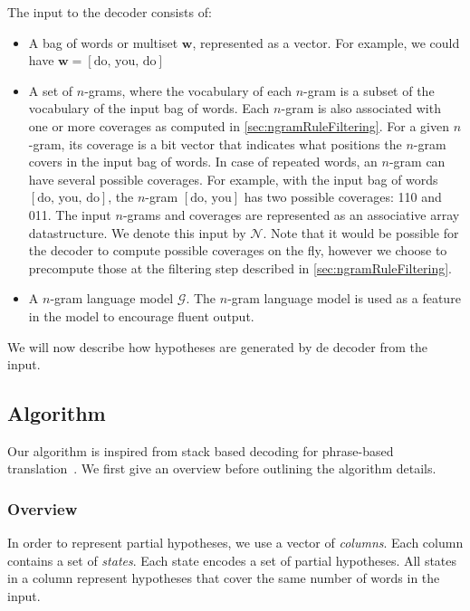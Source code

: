 The input to the decoder consists of:
%
\begin{itemize}
  \item A bag of words or multiset $\bm{w}$, represented as a vector.
    For example, we could have $\bm{w} = [\text{do, you, do}]$
  \item A set of $n$-grams, where the
    vocabulary of each $n$-gram is a subset of the vocabulary of the
    input bag of words. Each $n$-gram is also associated with
    one or more coverages as computed in \autoref{sec:ngramRuleFiltering}.
    For a given $n$-gram, its coverage is a bit vector
    that indicates what positions the $n$-gram covers in the input bag of words.
    In case of repeated words, an $n$-gram can have several possible
    coverages. For example, with the input bag of words
    $[\text{do, you, do}]$, the $n$-gram $[\text{do, you}]$ has
    two possible coverages: 110 and 011.
    The input $n$-grams and coverages are represented as
    an associative array datastructure. We denote this
    input by $\mathcal{N}$. Note that it would be possible for the decoder
    to compute possible coverages on the fly, however we choose to precompute those
    at the filtering step described in \autoref{sec:ngramRuleFiltering}.
  \item A $n$-gram language model $\mathcal{G}$. The $n$-gram
    language model is used as a feature in the model to
    encourage fluent output.
\end{itemize}
%
We will now describe how hypotheses are generated by de decoder
from the input.

\subsection{Algorithm}

Our algorithm is inspired from stack based decoding for phrase-based
translation~\citep{koehn:2010:book}. We first give an overview
before outlining the algorithm details.

\subsubsection{Overview}
\label{sec:gyroAlgorithmOverview}

In order to represent partial hypotheses, we use a vector
of \emph{columns}. Each column contains a set of
\emph{states}. Each state encodes a set of partial hypotheses.
All states in a column represent hypotheses that cover
the same number of words in the input.

